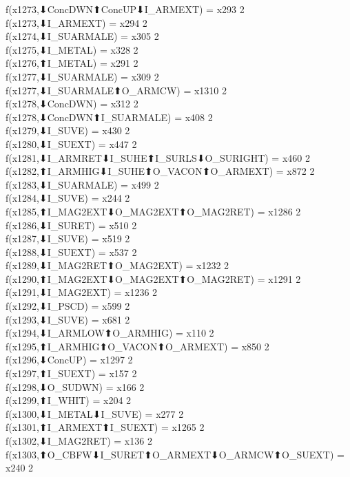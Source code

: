 f(x1273,⬇ConcDWN⬆ConcUP⬇I_ARMEXT) = x293 {2} \\
f(x1273,⬇I_ARMEXT) = x294 {2} \\
f(x1274,⬇I_SUARMALE) = x305 {2} \\
f(x1275,⬇I_METAL) = x328 {2} \\
f(x1276,⬆I_METAL) = x291 {2} \\
f(x1277,⬇I_SUARMALE) = x309 {2} \\
f(x1277,⬇I_SUARMALE⬆O_ARMCW) = x1310 {2} \\
f(x1278,⬇ConcDWN) = x312 {2} \\
f(x1278,⬇ConcDWN⬆I_SUARMALE) = x408 {2} \\
f(x1279,⬇I_SUVE) = x430 {2} \\
f(x1280,⬇I_SUEXT) = x447 {2} \\
f(x1281,⬇I_ARMRET⬇I_SUHE⬆I_SURLS⬇O_SURIGHT) = x460 {2} \\
f(x1282,⬆I_ARMHIG⬇I_SUHE⬆O_VACON⬆O_ARMEXT) = x872 {2} \\
f(x1283,⬇I_SUARMALE) = x499 {2} \\
f(x1284,⬇I_SUVE) = x244 {2} \\
f(x1285,⬆I_MAG2EXT⬇O_MAG2EXT⬆O_MAG2RET) = x1286 {2} \\
f(x1286,⬇I_SURET) = x510 {2} \\
f(x1287,⬇I_SUVE) = x519 {2} \\
f(x1288,⬇I_SUEXT) = x537 {2} \\
f(x1289,⬇I_MAG2RET⬆O_MAG2EXT) = x1232 {2} \\
f(x1290,⬆I_MAG2EXT⬇O_MAG2EXT⬆O_MAG2RET) = x1291 {2} \\
f(x1291,⬇I_MAG2EXT) = x1236 {2} \\
f(x1292,⬇I_PSCD) = x599 {2} \\
f(x1293,⬇I_SUVE) = x681 {2} \\
f(x1294,⬇I_ARMLOW⬆O_ARMHIG) = x110 {2} \\
f(x1295,⬆I_ARMHIG⬆O_VACON⬆O_ARMEXT) = x850 {2} \\
f(x1296,⬇ConcUP) = x1297 {2} \\
f(x1297,⬆I_SUEXT) = x157 {2} \\
f(x1298,⬇O_SUDWN) = x166 {2} \\
f(x1299,⬆I_WHIT) = x204 {2} \\
f(x1300,⬇I_METAL⬇I_SUVE) = x277 {2} \\
f(x1301,⬆I_ARMEXT⬆I_SUEXT) = x1265 {2} \\
f(x1302,⬇I_MAG2RET) = x136 {2} \\
f(x1303,⬆O_CBFW⬇I_SURET⬆O_ARMEXT⬇O_ARMCW⬆O_SUEXT) = x240 {2} \\
